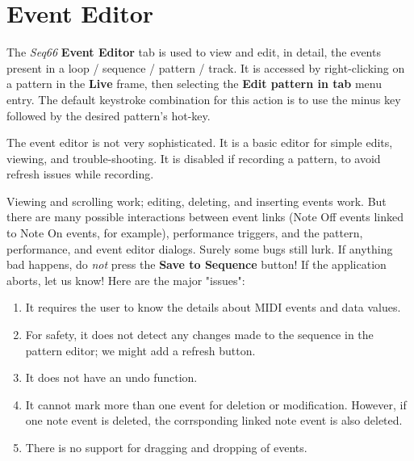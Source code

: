 %
%

\section{Event Editor}
\label{sec:event_editor}

   The \textsl{Seq66} \textbf{Event Editor} tab is used to view and edit,
   in detail, the events present in a loop / sequence / pattern / track.
   It is accessed by right-clicking on a pattern in the \textbf{Live} frame,
   then selecting the \textbf{Edit pattern in tab} menu entry.
   The default keystroke combination for this action is to use the minus key
   followed by the desired pattern's hot-key.

   The event editor is not very sophisticated.
   It is a basic editor for simple edits, viewing, and trouble-shooting.
   It is disabled if recording a pattern, to avoid refresh issues while
   recording.

   Viewing and scrolling work;
   editing, deleting, and inserting events work.
   But there are many possible interactions between event links
   (Note Off events linked to Note On events, for example),
   performance triggers, and the pattern,
   performance, and event editor dialogs.
   Surely some bugs still lurk.
   If anything bad happens, do \textsl{not} press the
   \textbf{Save to Sequence} button!
   If the application aborts, let us know!
   Here are the major "issues":

   \begin{enumerate}
      \item It requires the user to know the details
         about MIDI events and data values.
      \item For safety, it does not detect any changes made to the sequence in
         the pattern editor; we might add a refresh button.
      \item It does not have an undo function.
      \item It cannot mark more than one event for deletion or modification.
         However, if one note event is deleted, the corrsponding linked note
         event is also deleted.
      \item There is no support for dragging and dropping of events.
   \end{enumerate}

